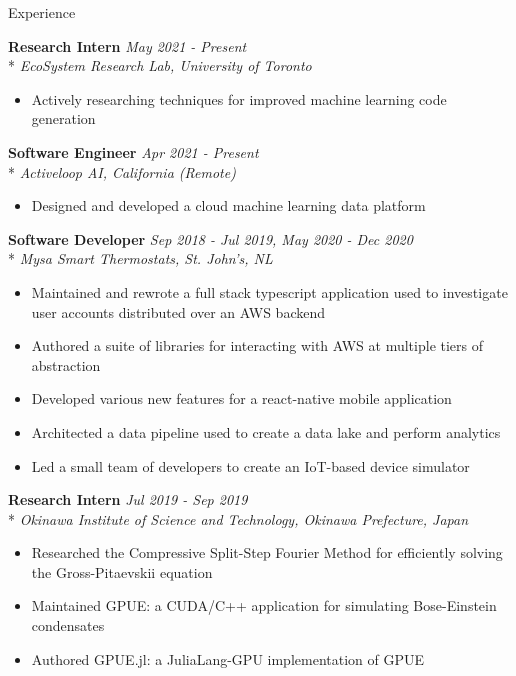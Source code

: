 \documentclass[11pt, letterpaper]{article}
\begin{document}
\begin{section}{Experience}

\textbf{Research Intern}
\hfill
\textit{May 2021 - Present}\\*
\textit{EcoSystem Research Lab, University of Toronto}
\begin{itemize}
  \item Actively researching techniques for improved machine learning code generation \\
\end{itemize}

\textbf{Software Engineer}
\hfill
\textit{Apr 2021 - Present}\\*
\textit{Activeloop AI, California (Remote)}
\begin{itemize}
  \item Designed and developed a cloud machine learning data platform \\
\end{itemize}

\textbf{Software Developer}
\hfill
\textit{Sep 2018 - Jul 2019, May 2020 - Dec 2020}\\*
\textit{Mysa Smart Thermostats, St. John's, NL}
\begin{itemize}
  \item Maintained and rewrote a full stack typescript application used to investigate user accounts distributed over an AWS backend
  \item Authored a suite of libraries for interacting with AWS at multiple tiers of abstraction
  \item Developed various new features for a react-native mobile application
  \item Architected a data pipeline used to create a data lake and perform analytics
  \item Led a small team of developers to create an IoT-based device simulator \\
\end{itemize}

\textbf{Research Intern}
\hfill
\textit{Jul 2019 - Sep 2019}\\*
\textit{Okinawa Institute of Science and Technology, Okinawa Prefecture, Japan}
\begin{itemize}
  \item Researched the Compressive Split-Step Fourier Method for efficiently solving the Gross-Pitaevskii equation
  \item Maintained GPUE: a CUDA/C++ application for simulating Bose-Einstein condensates
  \item Authored GPUE.jl: a JuliaLang-GPU implementation of GPUE
\end{itemize}

\end{section}
\end{document}
